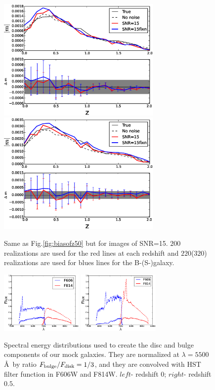 \documentclass[useAMS,usenatbib]{mn2e}
\begin{document}
\begin{figure}
  \includegraphics[width=8.0cm]{zs2n_b_snrtt15.eps}
  \includegraphics[width=8.0cm]{zs2n_s_snrtt15.eps}
\caption{Same as Fig.\ref{fig:biasofz50} but for images of SNR=15.
  $200$ realizations are used for the red lines at each redshift and
  $220$($320$) realizations are used for blues lines for the
  B-(S-)galaxy. }
\label{fig:biasofz15}
\end{figure}
%
\begin{figure}
\centerline{\includegraphics[width=4.0cm]{z0bandsed.eps}
\includegraphics[width=4.0cm]{z5bandsed.eps}}
\caption{Spectral energy distributions used to create the disc and
  bulge components of our mock galaxies. They are normalized at
  $\lambda=5500$\AA$\,$ by ratio $F_{\rm bulge}/F_{\rm disk}=1/3$, and they
  are convolved with HST filter function in F606W and F814W. $left$-
  redshift $0$; $right$- redshift $0.5$.}
\label{fig:sedz}
\end{figure}
\end{document}
